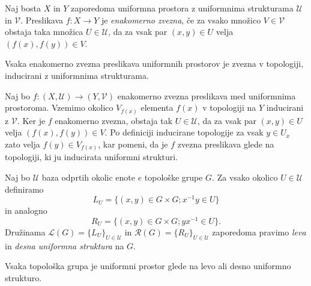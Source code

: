 \documentclass[mat1]{fmfdelo}
\newcommand{\Ucurl}{\mathcal{U}}
\begin{document}
\begin{definicija}\label{def:enakzveznost}
	Naj bosta $X$ in $Y$ zaporedoma uniformna prostora z uniformnima strukturama $\mathcal{U}$ in $\mathcal{V}$. Preslikava $f\colon X \to Y$ je \emph{enakomerno zvezna}, če za vsako množico $V \in \mathcal{V}$ obstaja taka množica $U \in \mathcal{U}$, da za vsak par $(x, y) \in U$ velja $(f(x), f(y)) \in V$.
\end{definicija}

\begin{trditev}\label{trd:enakzveznazvezna}
	Vsaka enakomerno zvezna preslikava uniformnih prostorov je zvezna v topologiji, inducirani z uniformnima strukturama.
\end{trditev}

\begin{dokaz}
	Naj bo $f\colon (X, \mathcal{U}) \to (Y, \mathcal{V})$ enakomerno zvezna preslikava med uniformnima prostoroma. Vzemimo okolico $V_{f(x)}$ elementa $f(x)$ v topologiji na $Y$ inducirani z $\mathcal{V}$. Ker je $f$ enakomerno zvezna, obstaja tak $U \in \mathcal{U}$, da za vsak par $(x, y) \in U$ velja $(f(x), f(y)) \in V$. Po definiciji inducirane topologije za vsak $y \in U_x$ zato velja $f(y) \in V_{f(x)}$, kar pomeni, da je $f$ zvezna preslikava glede na topologiji, ki ju inducirata uniformni strukturi.
\end{dokaz}

\begin{definicija}\label{def:levadesnauni}
	Naj bo $\Ucurl$ baza odprtih okolic enote $e$ topološke grupe $G$. Za vsako okolico $U \in \Ucurl$ definiramo \[L_U = \lbrace (x, y) \in G \times G ; x^{-1}y \in U \rbrace\] in analogno \[R_U = \lbrace (x, y) \in G \times G ; yx^{-1} \in U \rbrace.\] Družinama $\mathcal{L}(G) = \lbrace L_U \rbrace_{U \in \Ucurl}$ in $\mathcal{R}(G) = \lbrace R_U \rbrace_{U \in \Ucurl}$ zaporedoma pravimo \emph{leva} in \emph{desna uniformna struktura} na $G$.
\end{definicija}

\begin{trditev}\label{trd:topguniform}
	Vsaka topološka grupa je uniformni prostor glede na levo ali desno uniformno strukturo.
\end{trditev}
\end{document}
